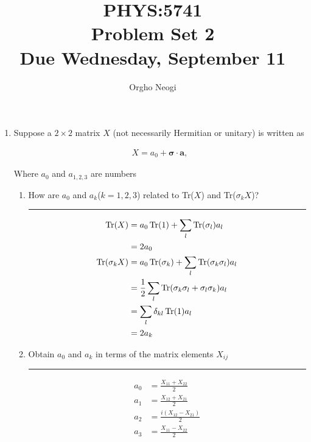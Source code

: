 \documentclass[12pt, oneside]{article}
\title{PHYS:5741 \\Problem Set 2 \\Due Wednesday, September 11}
\author{Orgho Neogi}
\date{}
\newenvironment{answer}
  {\vspace*{0.2cm} \rule{12cm}{0.02cm} \vspace*{0.2cm}}
  {\vspace*{0.2cm}}
\begin{document}
\maketitle

  \begin{enumerate}
    \item Suppose a $2 \times 2$ matrix $X$ (not necessarily Hermitian or unitary) is written as

    \begin{align*}
      X = a_0 + \boldsymbol{\sigma \cdot a},
    \end{align*}

    Where $a_0$ and $a_{1,2,3}$ are numbers

    \begin{enumerate}
      \item How are $a_0$ and $a_k$($k=1,2,3$) related to Tr($X$) and Tr($\sigma_k X$)?

      \begin{answer}
        \begin{align*}
          \Tr(X) &= a_0\Tr(1) + \sum_l\Tr(\sigma_l)a_l\\
                 &= 2a_0\\
          \Tr(\sigma_kX)&= a_0\Tr(\sigma_k) + \sum_l\Tr(\sigma_k\sigma_l)a_l\\
                        &= \frac{1}{2}\sum_l\Tr(\sigma_k\sigma_l + \sigma_l\sigma_k)a_l\\
                        &= \sum_l\delta_{kl}\Tr(1)a_l\\
                        &= 2a_k
        \end{align*}
      \end{answer}

      \item Obtain $a_0$ and $a_k$ in terms of the matrix elements $X_{ij}$

      \begin{answer}
        \begin{align*}
          a_0 &= \frac{X_{11}+X_{22}}{2}\\
          a_1 &= \frac{X_{12}+X_{21}}{2}\\
          a_2 &= \frac{i(X_{12}-X_{21})}{2}\\
          a_3 &= \frac{X_{11}-X_22}{2}\\
        \end{align*}
      \end{answer}
    \end{enumerate}


\end{enumerate}
\end{document}
